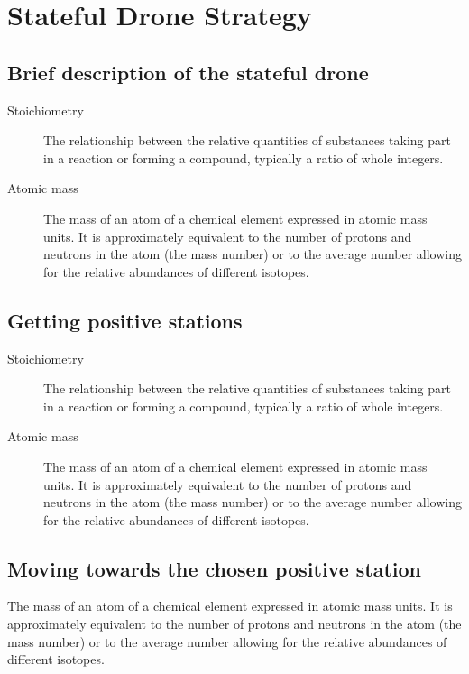 \documentclass{article}
\begin{document}
\section{Stateful Drone Strategy}

\subsection{Brief description of the stateful drone}
\label{Class Relationships}
\begin{description}
\item[Stoichiometry]
The relationship between the relative quantities of substances taking part in a reaction or forming a compound, typically a ratio of whole integers.
\item[Atomic mass]
The mass of an atom of a chemical element expressed in atomic mass units. It is approximately equivalent to the number of protons and neutrons in the atom (the mass number) or to the average number allowing for the relative abundances of different isotopes. 
\end{description} 

\subsection{Getting positive stations}
\label{Class Relationships}
\begin{description}
\item[Stoichiometry]
The relationship between the relative quantities of substances taking part in a reaction or forming a compound, typically a ratio of whole integers.
\item[Atomic mass]
The mass of an atom of a chemical element expressed in atomic mass units. It is approximately equivalent to the number of protons and neutrons in the atom (the mass number) or to the average number allowing for the relative abundances of different isotopes. 
\end{description} 

\subsection{Moving towards the chosen positive station}
\label{Class Relationships}
\begin{description}
The mass of an atom of a chemical element expressed in atomic mass units. It is approximately equivalent to the number of protons and neutrons in the atom (the mass number) or to the average number allowing for the relative abundances of different isotopes. 
\end{description} 
\end{document}
